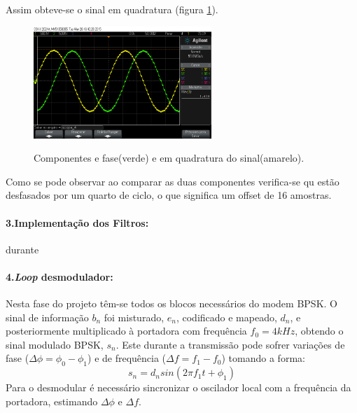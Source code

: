 \documentclass[11pt]{article}
\numberwithin{equation}{section}
\begin{document}
Assim obteve-se o sinal em quadratura (figura \ref{quad}).
\begin{figure}[h]
	\centering     
	\includegraphics[width=0.6\textwidth]{./quadratura}~\\
	\caption{Componentes e fase(verde) e em quadratura do sinal(amarelo).}
	\label{quad}
\end{figure}
Como se pode observar ao comparar as duas componentes verifica-se qu estão desfasados por um quarto de ciclo, o que significa um offset de 16 amostras.
\paragraph{3.Implementação dos Filtros:} \hspace{0pt}                                                                                                                                                                                                              durante

\paragraph{4.\textit{Loop} desmodulador:} \hspace{0pt}
 
Nesta fase do projeto têm-se todos os blocos necessários do modem BPSK. O sinal de informação $b_n$ foi misturado, $e_n$, codificado e mapeado, $d_n$, e posteriormente multiplicado à portadora com frequência $f_0 = 4kHz$, obtendo o sinal modulado BPSK, $s_n$. Este durante a transmissão pode sofrer variações de fase ($\Delta\phi=\phi_0-\phi_1$) e de frequência ($\Delta f = f_1-f_0$) tomando a forma:
\begin{equation}
	s_n=d_nsin(2\pi f_1t+ \phi_1)
\end{equation}
 Para o desmodular é necessário sincronizar o oscilador local com a frequência da portadora, estimando $\Delta\phi$ e $\Delta f$.
\end{document}
